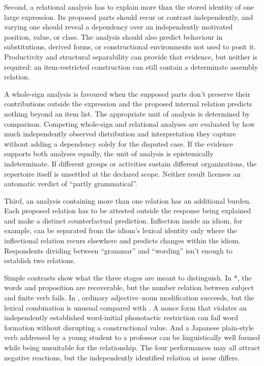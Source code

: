 \documentclass[12pt,letterpaper]{article}
\begin{document}
Second, a relational analysis has to explain more than the stored identity of one
large expression. Its proposed parts should recur or contrast independently, and
varying one should reveal a dependency over an independently motivated position,
value, or class. The analysis should also predict behaviour in substitutions,
derived forms, or constructional environments not used to posit it. Productivity
and structural separability can provide that evidence, but neither is required:
an item-restricted construction can still contain a determinate assembly relation.

A whole-sign analysis is favoured when the supposed parts don't preserve their
contributions outside the expression and the proposed internal relation predicts
nothing beyond an item list. The appropriate unit of analysis is determined by
comparison. Competing
whole-sign and relational analyses are evaluated by how much independently observed
distribution and interpretation they capture without adding a dependency solely
for the disputed case. If the evidence supports both analyses equally, the unit
of analysis is epistemically indeterminate. If different groups or activities
sustain different organizations, the repertoire itself is unsettled at the
declared scope. Neither
result licenses an automatic verdict of \enquote{partly grammatical}.

Third, an analysis containing more than one relation has an additional burden.
Each proposed relation has to be attested outside the response being explained and
make a distinct counterfactual prediction. Inflection inside an idiom, for
example, can be separated from the idiom's lexical identity only where the
inflectional relation recurs elsewhere and predicts changes within the idiom.
Respondents dividing between \enquote{grammar} and \enquote{wording} isn't enough
to establish two relations.

Simple contrasts show what the three stages are meant to distinguish. In
*, the words and proposition are recoverable, but
the number relation between subject and finite verb fails. In , ordinary adjective--noun modification succeeds, but the lexical
combination is unusual compared with . A nonce form that
violates an independently established word-initial phonotactic restriction can
fail word formation without disrupting a constructional value. And a Japanese plain-style verb addressed by a young
student to a professor
can be linguistically well formed while being unsuitable for the relationship.
The four performances may all attract negative reactions, but the independently
identified relation at issue differs.
\end{document}
